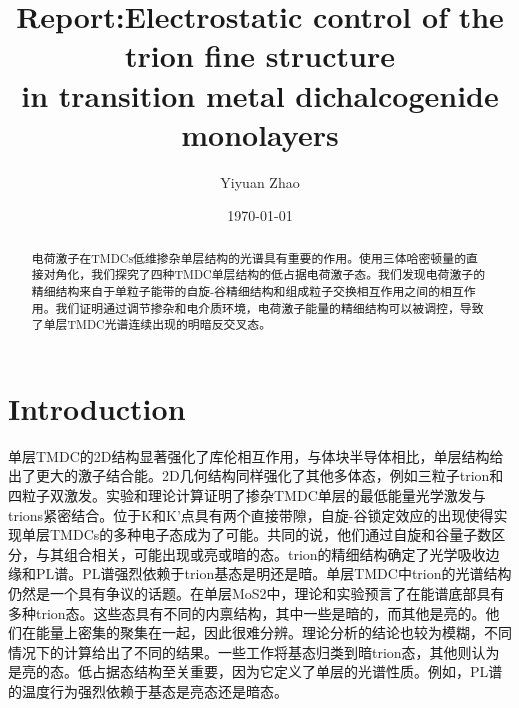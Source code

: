 \documentclass[reprint, aps, prb, showkeys]{revtex4-2}
\begin{document}
\title{Report:Electrostatic control of the trion fine structure \\
in transition metal dichalcogenide monolayers}

\author{Yiyuan Zhao}
\date{\today}

\begin{abstract}
电荷激子在TMDCs低维掺杂单层结构的光谱具有重要的作用。使用三体哈密顿量的直接对角化，我们探究了四种TMDC单层结构的低占据电荷激子态。我们发现电荷激子的精细结构来自于单粒子能带的自旋-谷精细结构和组成粒子交换相互作用之间的相互作用。我们证明通过调节掺杂和电介质环境，电荷激子能量的精细结构可以被调控，导致了单层TMDC光谱连续出现的明暗反交叉态。

\end{abstract}


\maketitle

\section{Introduction}
单层TMDC的2D结构显著强化了库伦相互作用，与体块半导体相比，单层结构给出了更大的激子结合能。2D几何结构同样强化了其他多体态，例如三粒子trion和四粒子双激发。实验和理论计算证明了掺杂TMDC单层的最低能量光学激发与trions紧密结合。位于K和K'点具有两个直接带隙，自旋-谷锁定效应的出现使得实现单层TMDCs的多种电子态成为了可能。共同的说，他们通过自旋和谷量子数区分，与其组合相关，可能出现或亮或暗的态。trion的精细结构确定了光学吸收边缘和PL谱。PL谱强烈依赖于trion基态是明还是暗。单层TMDC中trion的光谱结构仍然是一个具有争议的话题。在单层MoS2中，理论和实验预言了在能谱底部具有多种trion态。这些态具有不同的内禀结构，其中一些是暗的，而其他是亮的。他们在能量上密集的聚集在一起，因此很难分辨。理论分析的结论也较为模糊，不同情况下的计算给出了不同的结果。一些工作将基态归类到暗trion态，其他则认为是亮的态。低占据态结构至关重要，因为它定义了单层的光谱性质。例如，PL谱的温度行为强烈依赖于基态是亮态还是暗态。
\end{document}
